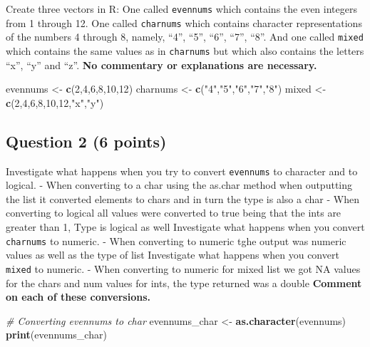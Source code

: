 \documentclass[
]{article}
\newenvironment{Shaded}{\begin{snugshade}}{\end{snugshade}}
\newcommand{\CommentTok}[1]{\textcolor[rgb]{0.56,0.35,0.01}{\textit{#1}}}
\newcommand{\DecValTok}[1]{\textcolor[rgb]{0.00,0.00,0.81}{#1}}
\newcommand{\FunctionTok}[1]{\textcolor[rgb]{0.13,0.29,0.53}{\textbf{#1}}}
\newcommand{\NormalTok}[1]{#1}
\newcommand{\OtherTok}[1]{\textcolor[rgb]{0.56,0.35,0.01}{#1}}
\newcommand{\StringTok}[1]{\textcolor[rgb]{0.31,0.60,0.02}{#1}}
\begin{document}
Create three vectors in R: One called \texttt{evennums} which contains
the even integers from 1 through 12. One called \texttt{charnums} which
contains character representations of the numbers 4 through 8, namely,
``4'', ``5'', ``6'', ``7'', ``8''. And one called \texttt{mixed} which
contains the same values as in \texttt{charnums} but which also contains
the letters ``x'', ``y'' and ``z''. \textbf{No commentary or
explanations are necessary.}

\begin{Shaded}
\begin{Highlighting}[]
\NormalTok{evennums }\OtherTok{\textless{}{-}} \FunctionTok{c}\NormalTok{(}\DecValTok{2}\NormalTok{,}\DecValTok{4}\NormalTok{,}\DecValTok{6}\NormalTok{,}\DecValTok{8}\NormalTok{,}\DecValTok{10}\NormalTok{,}\DecValTok{12}\NormalTok{)}
\NormalTok{charnums }\OtherTok{\textless{}{-}} \FunctionTok{c}\NormalTok{(}\StringTok{"4"}\NormalTok{,}\StringTok{"5"}\NormalTok{,}\StringTok{"6"}\NormalTok{,}\StringTok{"7"}\NormalTok{,}\StringTok{"8"}\NormalTok{)}
\NormalTok{mixed }\OtherTok{\textless{}{-}} \FunctionTok{c}\NormalTok{(}\DecValTok{2}\NormalTok{,}\DecValTok{4}\NormalTok{,}\DecValTok{6}\NormalTok{,}\DecValTok{8}\NormalTok{,}\DecValTok{10}\NormalTok{,}\DecValTok{12}\NormalTok{,}\StringTok{"x"}\NormalTok{,}\StringTok{"y"}\NormalTok{)}
\end{Highlighting}
\end{Shaded}

\subsection{Question 2 (6 points)}\label{question-2-6-points}

Investigate what happens when you try to convert \texttt{evennums} to
character and to logical. - When converting to a char using the as.char
method when outputting the list it converted elements to chars and in
turn the type is also a char - When converting to logical all values
were converted to true being that the ints are greater than 1, Type is
logical as well Investigate what happens when you convert
\texttt{charnums} to numeric. - When converting to numeric tghe output
was numeric values as well as the type of list Investigate what happens
when you convert \texttt{mixed} to numeric. - When converting to numeric
for mixed list we got NA values for the chars and num values for ints,
the type returned was a double \textbf{Comment on each of these
conversions.}

\begin{Shaded}
\begin{Highlighting}[]
\CommentTok{\# Converting evennums to char}
\NormalTok{evennums\_char }\OtherTok{\textless{}{-}} \FunctionTok{as.character}\NormalTok{(evennums)}
\FunctionTok{print}\NormalTok{(evennums\_char)}
\end{Highlighting}
\end{Shaded}
\end{document}
